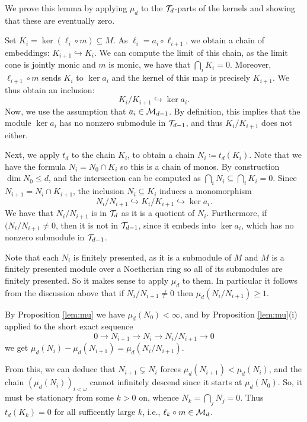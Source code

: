 \documentclass[runningheads]{llncs}
\begin{document}
\begin{proofE}
We prove this lemma by applying $\mu_d$ to the $\mathcal T_d$-parts of the kernels and showing that these are eventually zero.

Set $K_i = \ker(\ell_i \circ m) \subseteq M$. As $\ell_i = a_i \circ \ell_{i+1}$, we obtain a chain  of embeddings: $K_{i+1}\hookrightarrow K_i$. 
We can compute the limit of this chain, as the limit cone is jointly monic and $m$ is monic,  we have that $\bigcap_i K_i = 0$.
 Moreover, $\ell_{i+1}\circ m$ sends $K_i$ to $\ker a_i$ and the kernel of this map is precisely $K_{i+1}$. We thus obtain an inclusion:
\begin{equation*}
  K_i/K_{i+1} \hookrightarrow \ker a_i .
\end{equation*}
Now, we use the assumption that $a_i \in \mathcal{M}_{d-1}$. By definition, this implies that the module $\ker a_i$ has no nonzero submodule in $\mathcal T_{d-1}$, and thus $K_i/K_{i+1}$ does not either.


Next, we apply $t_d$ to the chain $K_i$, to obtain a chain  $N_i \coloneqq t_d(K_i).$ Note that we have the formula $N_i = N_0 \cap K_i$ so this is a chain of monos. 
By construction $\dim N_0 \leq d$, and the intersection can be computed as $\bigcap_i N_i \subseteq \bigcap_i K_i = 0$. 
Since $N_{i+1}=N_i \cap K_{i+1}$, the inclusion $N_i\subseteq K_i$ induces a monomorphism
\begin{equation*}
N_i/N_{i+1}\hookrightarrow K_i/K_{i+1}\hookrightarrow\ker a_i.
\end{equation*}
We have that $N_i/N_{i+1}$ is in $\mathcal T_d$ as it is a quotient of $N_i$. Furthermore, if $(N_i/N_{i+1} \neq 0$, then it is not in $\mathcal T_{d-1}$, since it embeds into $\ker a_i$, which has no nonzero submodule in $\mathcal T_{d-1}$.

Note that each $N_i$ is finitely presented, as it is a submodule of $M$ and $M$ is a finitely presented module over a Noetherian ring so all of its submodules are finitely presented.
So it makes sense to apply $\mu_d$ to them. 
 In particular it follows from the discussion above that if $N_i/N_{i+1} \neq 0$ then $\mu_d(N_i/N_{i+1})\geq 1$.

By Proposition \ref{lem:mu} we have $\mu_d(N_0) < \infty$, and by Proposition \ref{lem:mu}(i) applied to the short exact sequence
\begin{equation*}
0 \to N_{i+1}  \to  N_i \to  N_i/N_{i+1} \to 0
\end{equation*}
we get $\mu_d(N_i) - \mu_d(N_{i+1}) = \mu_d(N_i/N_{i+1})$.

From this, we can deduce that $N_{i+1} \subsetneq N_i$ forces $\mu_d(N_{i+1}) < \mu_d(N_i)$, and the chain $(\mu_d( N_i))_{i <\omega}$ cannot infinitely descend since it starts at  $\mu_d(N_0)$. So, it must be stationary from some $k>0$ on, whence $N_k = \bigcap_j N_j = 0$. Thus $t_d(K_k) = 0$ for all sufficently large $k$, i.e., $\ell_k \circ m \in \mathcal{M}_d$.
\end{proofE}
\end{document}
